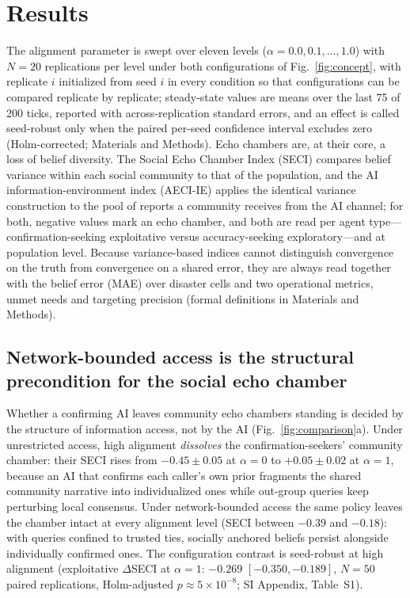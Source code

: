 \documentclass[pdflatex,sn-nature]{sn-jnl}
\begin{document}
\section{Results}\label{sec:results}

The alignment parameter is swept over eleven levels ($\alpha = 0.0, 0.1, \ldots, 1.0$) with $N = 20$ replications per level under both configurations of Fig.~\ref{fig:concept}, with replicate $i$ initialized from seed $i$ in every condition so that configurations can be compared replicate by replicate; steady-state values are means over the last 75 of 200 ticks, reported with across-replication standard errors, and an effect is called seed-robust only when the paired per-seed confidence interval excludes zero (Holm-corrected; Materials and Methods). Echo chambers are, at their core, a loss of belief diversity. The Social Echo Chamber Index (SECI) compares belief variance within each social community to that of the population, and the AI information-environment index (AECI-IE) applies the identical variance construction to the pool of reports a community receives from the AI channel; for both, negative values mark an echo chamber, and both are read per agent type---confirmation-seeking exploitative versus accuracy-seeking exploratory---and at population level. Because variance-based indices cannot distinguish convergence on the truth from convergence on a shared error, they are always read together with the belief error (MAE) over disaster cells and two operational metrics, unmet needs and targeting precision (formal definitions in Materials and Methods).

\subsection{Network-bounded access is the structural precondition for the social echo chamber}\label{sec:claim1}

Whether a confirming AI leaves community echo chambers standing is decided by the structure of information access, not by the AI (Fig.~\ref{fig:comparison}a). Under unrestricted access, high alignment \emph{dissolves} the confirmation-seekers' community chamber: their SECI rises from $-0.45 \pm 0.05$ at $\alpha=0$ to $+0.05 \pm 0.02$ at $\alpha=1$, because an AI that confirms each caller's own prior fragments the shared community narrative into individualized ones while out-group queries keep perturbing local consensus. Under network-bounded access the same policy leaves the chamber intact at every alignment level (SECI between $-0.39$ and $-0.18$): with queries confined to trusted ties, socially anchored beliefs persist alongside individually confirmed ones. The configuration contrast is seed-robust at high alignment (exploitative $\Delta$SECI at $\alpha=1$: $-0.269$ $[-0.350, -0.189]$, $N=50$ paired replications, Holm-adjusted $p \approx 5\times10^{-8}$; SI Appendix, Table~S1).
\end{document}
